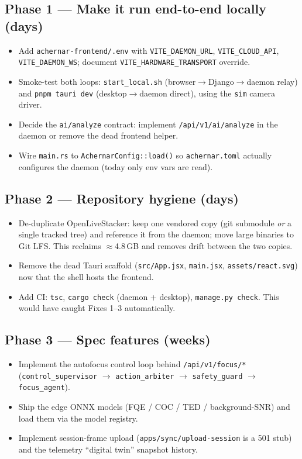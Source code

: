 \documentclass[11pt]{article}
\newcommand{\fn}[1]{\texttt{#1}}
\begin{document}
\subsection*{Phase 1 --- Make it run end-to-end locally (days)}
\begin{itemize}[leftmargin=1.3em]
  \item Add \fn{achernar-frontend/.env} with \texttt{VITE\_DAEMON\_URL}, \texttt{VITE\_CLOUD\_API},
  \texttt{VITE\_DAEMON\_WS}; document \texttt{VITE\_HARDWARE\_TRANSPORT} override.
  \item Smoke-test both loops: \texttt{start\_local.sh} (browser$\rightarrow$Django$\rightarrow$daemon relay)
  and \texttt{pnpm tauri dev} (desktop$\rightarrow$daemon direct), using the \texttt{sim} camera driver.
  \item Decide the \texttt{ai/analyze} contract: implement \texttt{/api/v1/ai/analyze} in the daemon or
  remove the dead frontend helper.
  \item Wire \fn{main.rs} to \texttt{AchernarConfig::load()} so \fn{achernar.toml} actually configures the
  daemon (today only env vars are read).
\end{itemize}

\subsection*{Phase 2 --- Repository hygiene (days)}
\begin{itemize}[leftmargin=1.3em]
  \item De-duplicate OpenLiveStacker: keep one vendored copy (git submodule \emph{or} a single tracked
  tree) and reference it from the daemon; move large binaries to Git LFS. This reclaims $\approx$4.8\,GB
  and removes drift between the two copies.
  \item Remove the dead Tauri scaffold (\fn{src/App.jsx}, \fn{main.jsx}, \fn{assets/react.svg}) now that
  the shell hosts the frontend.
  \item Add CI: \texttt{tsc}, \texttt{cargo check} (daemon + desktop), \texttt{manage.py check}. This would
  have caught Fixes 1--3 automatically.
\end{itemize}

\subsection*{Phase 3 --- Spec features (weeks)}
\begin{itemize}[leftmargin=1.3em]
  \item Implement the autofocus control loop behind \texttt{/api/v1/focus/*}
  (\texttt{control\_supervisor} $\rightarrow$ \texttt{action\_arbiter} $\rightarrow$ \texttt{safety\_guard}
  $\rightarrow$ \texttt{focus\_agent}).
  \item Ship the edge ONNX models (FQE / COC / TED / background-SNR) and load them via the model registry.
  \item Implement session-frame upload (\texttt{apps/sync/upload-session} is a 501 stub) and the telemetry
  ``digital twin'' snapshot history.
\end{itemize}
\end{document}

